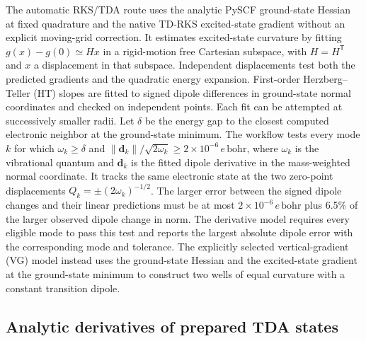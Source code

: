 The automatic RKS/TDA route uses the analytic PySCF ground-state
Hessian at fixed quadrature and the native TD-RKS excited-state
gradient without an explicit moving-grid correction. It estimates
excited-state curvature by fitting $g(x)-g(0)\simeq H x$ in a rigid-motion
free Cartesian subspace, with $H=H^{\mathsf T}$ and $x$ a displacement
in that subspace. Independent displacements test both the predicted
gradients and the quadratic energy expansion. First-order
Herzberg--Teller (HT) slopes are fitted to signed dipole differences
in ground-state normal coordinates and checked on independent points.
Each fit can be attempted at successively smaller radii. Let $\delta$
be the energy gap to the closest computed electronic neighbor at the
ground-state minimum. The workflow tests every mode $k$ for which
$\omega_k\ge\delta$ and
$\|\mathbf d_k\|/\sqrt{2\omega_k}\ge 2\times10^{-6}\,e\,\mathrm{bohr}$,
where $\omega_k$ is the vibrational quantum and $\mathbf d_k$ is the
fitted dipole derivative in the mass-weighted normal coordinate.
It tracks the same electronic state at the two
zero-point displacements $Q_k=\pm(2\omega_k)^{-1/2}$. The larger error
between the signed dipole changes and their linear predictions must be
at most $2\times10^{-6}\,e\,\mathrm{bohr}$ plus 6.5\% of the larger
observed dipole change in norm. The derivative model requires every
eligible mode to pass this test and reports the largest absolute dipole
error with the corresponding mode and tolerance. The explicitly selected
vertical-gradient (VG) model instead uses the ground-state Hessian and
the excited-state gradient at the ground-state minimum to construct
two wells of equal curvature with a constant transition dipole.

\subsection{Analytic derivatives of prepared TDA states}
\label{sec:electronic-analytic}

